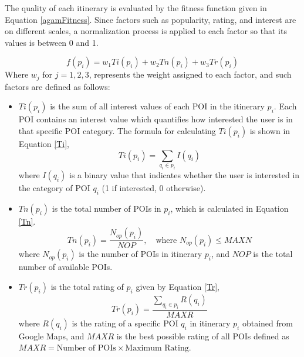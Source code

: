The quality of each itinerary is evaluated by the fitness function given in Equation \ref{agamFitness}. Since factors such as popularity, rating, and interest are on different scales, a normalization process is applied to each factor so that its values is between 0 and 1. 

\begin{equation}
	\label{agamFitness}
	f(p_i) = w_{1}Ti(p_i) + w_{2}Tn(p_i) + w_{3}Tr(p_i) 
\end{equation}
Where $w _{j}$ for $j = 1, 2, 3$, represents the weight assigned to each factor, and such factors are defined as follows:
\begin{itemize}
    
    \item $Ti(p_i)$ is the sum of all interest values of each POI in the itinerary $p_i$. Each POI contains an interest value which quantifies how interested the user is in that specific POI category. The formula for calculating $Ti(p_i)$ is shown in Equation \ref{Ti},
    \begin{equation}
		\label{Ti}
		Ti ( p _{i} ) = \sum _{q_i \in p_i} I(q_i)
	\end{equation}
	where $I(q_i)$ is a binary value that indicates whether the user is interested in the category of POI $q_i$ (1 if interested, 0 otherwise).
    
    \item $Tn (p _{i})$ is the total number of POIs in $p _{i}$, which is calculated in Equation \ref{Tn}.
    \begin{equation}
        \label{Tn}
        Tn ( p _{i}) = \frac{N _{op} ( p _{i} )}{NOP}, \quad \text{where } N _{op} ( p _{i} ) \le MAXN 
    \end{equation}
    where $N _{op} ( p _{i} )$ is the number of POIs in itinerary $p _{i}$, and $NOP$ is the total number of available POIs.
    
    \item $Tr( p _{i} )$ is the total rating of $p_i$ given by Equation \ref{Tr},
    \begin{equation}
        \label{Tr}
        Tr ( p _{i} ) = \frac{\sum_{q_i \in p_i} R(q_i)}{MAXR}
    \end{equation} 
    where $R(q_i)$ is the rating of a specific POI $q_i$ in itinerary $p_i$ obtained from Google Maps, and $MAXR$ is the best possible rating of all POIs defined as $MAXR = \text{Number of POIs} \times \text{Maximum Rating}$.
\end{itemize}

